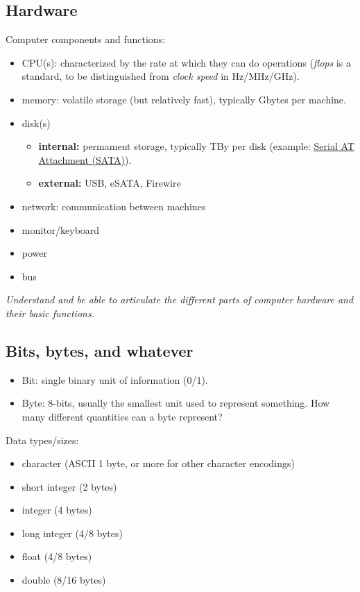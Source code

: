 \documentclass{article}
\newcommand{\test}[1]{%
    \begin{center}
        \colorbox{hl}{\parbox{0.9\textwidth}{\emph{\centering #1}}}
    \end{center}}
\begin{document}
\subsection{Hardware}
Computer components and functions:
\begin{itemize}
    \item CPU(s): characterized by the rate at which they can do
        operations (\textit{flops} is a standard, to be distinguished from
        \textit{clock speed} in Hz/MHz/GHz).
    \item memory: volatile storage (but relatively fast),
        typically Gbytes per machine.
    \item disk(s)
        \begin{itemize}
            \item \textbf{internal:} permament storage, typically TBy per disk
                (example: \href{https://en.wikipedia.org/wiki/Serial_ATA}
                {Serial AT Attachment (SATA)}).
            \item \textbf{external:} USB, eSATA, Firewire
        \end{itemize}
    \item network: communication between machines
    \item monitor/keyboard
    \item power
    \item bus
\end{itemize}

\test{Understand and be able to articulate the different parts of computer
hardware and their basic functions.}

\subsection{Bits, bytes, and whatever}
\begin{itemize}
    \item Bit: single binary unit of information (0/1).
    \item Byte: 8-bits, usually the smallest unit used to represent
        something. How many different quantities can a byte represent?
\end{itemize}
Data types/sizes:
\begin{itemize}
    \item character (ASCII 1 byte, or more for other character encodings)
    \item short integer (2 bytes)
    \item integer (4 bytes)
    \item long integer (4/8 bytes)
    \item float (4/8 bytes)
    \item double (8/16 bytes)
\end{itemize}
\end{document}
